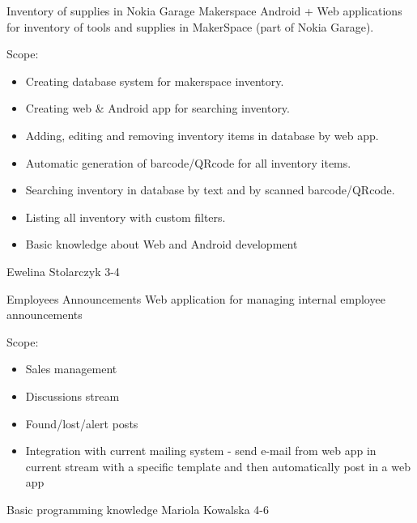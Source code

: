 \begin{project}
{Inventory of supplies in Nokia Garage Makerspace}
{Android + Web applications for inventory of tools and supplies in MakerSpace (part of Nokia Garage).}
{
Scope:
\begin{itemize}
	\item Creating database system for makerspace inventory.
	\item Creating web \& Android app for searching inventory.
	\item Adding, editing and removing inventory items in database by web app.
	\item Automatic generation of barcode/QRcode for all inventory items.
	\item Searching inventory in database by text and by scanned barcode/QRcode.
	\item Listing all inventory with custom filters.
\end{itemize}
}
{
\begin{itemize}
	\item Basic knowledge about Web and Android development
\end{itemize}
}
{Ewelina Stolarczyk}
{3-4}
\end{project}
\begin{project}
{Employees Announcements}
{Web application for managing internal employee announcements} 
{
Scope:
\begin{itemize}
	\item Sales management
	\item Discussions stream
	\item Found/lost/alert posts
	\item Integration with current mailing system - send e-mail from web app in current stream with a specific template and then automatically post in a web app
\end{itemize}
}
{
Basic programming knowledge
}
{Mariola Kowalska}
{4-6}
\end{project}
